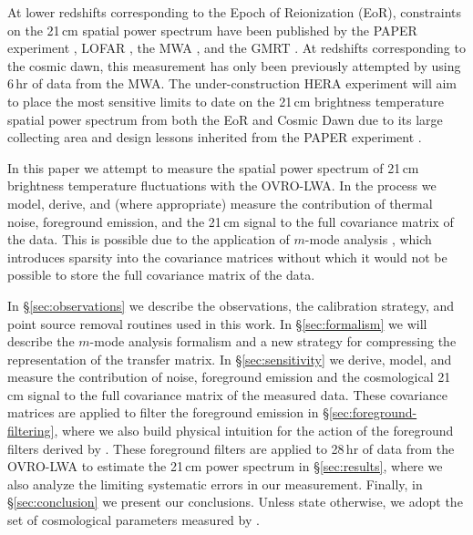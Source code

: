 \begin{bibunit}
At lower redshifts corresponding to the Epoch of Reionization (EoR), constraints on the 21\,cm
spatial power spectrum have been published by the PAPER experiment \citep{2015ApJ...809...61A},
LOFAR \citep{2017ApJ...838...65P}, the MWA \citep{2016ApJ...833..102B}, and the GMRT
\citep{2013MNRAS.433..639P}. At redshifts corresponding to the cosmic dawn, this measurement has
only been previously attempted by \citet{2016MNRAS.460.4320E} using 6\,hr of data from the MWA.  The
under-construction HERA experiment will aim to place the most sensitive limits to date on the 21\,cm
brightness temperature spatial power spectrum from both the EoR and Cosmic Dawn due to its large
collecting area and design lessons inherited from the PAPER experiment \citep{2017PASP..129d5001D}.

In this paper we attempt to measure the spatial power spectrum of 21\,cm brightness temperature
fluctuations with the OVRO-LWA. In the process we model, derive, and (where appropriate) measure the
contribution of thermal noise, foreground emission, and the 21\,cm signal to the full covariance
matrix of the data. This is possible due to the application of $m$-mode analysis
\citep{2014ApJ...781...57S, 2015PhRvD..91h3514S}, which introduces sparsity into the covariance
matrices without which it would not be possible to store the full covariance matrix of the data.

In \S\ref{sec:observations} we describe the observations, the calibration strategy, and point source
removal routines used in this work. In \S\ref{sec:formalism} we will describe the $m$-mode analysis
formalism and a new strategy for compressing the representation of the transfer matrix.  In
\S\ref{sec:sensitivity} we derive, model, and measure the contribution of noise, foreground emission
and the cosmological 21\,cm signal to the full covariance matrix of the measured data.  These
covariance matrices are applied to filter the foreground emission in
\S\ref{sec:foreground-filtering}, where we also build physical intuition for the action of the
foreground filters derived by \citep{2014ApJ...781...57S, 2015PhRvD..91h3514S}.  These foreground
filters are applied to 28\,hr of data from the OVRO-LWA to estimate the 21\,cm power spectrum in
\S\ref{sec:results}, where we also analyze the limiting systematic errors in our measurement.
Finally, in \S\ref{sec:conclusion} we present our conclusions.  Unless state otherwise, we adopt the
set of cosmological parameters measured by \citet{2016A&A...594A..13P}.


\end{bibunit}
